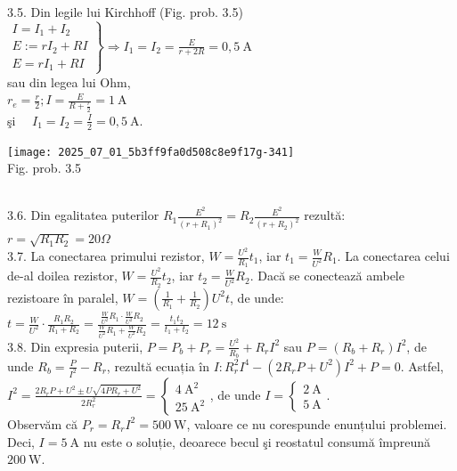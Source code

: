 3.5. Din legile lui Kirchhoff (Fig. prob. 3.5)\\ $\left.\begin{array}{l} I=I_{1}+I_{2} \\ E:=r I_{2}+R I \\ E=r I_{1}+R I \end{array}\right\} \Rightarrow I_{1}=I_{2}=\frac{E}{r+2 R}=0,5 \mathrm{~A}$\\ sau din legea lui Ohm,\\ $r_{e}=\frac{r}{2} ; I=\frac{E}{R+\frac{r}{2}}=1 \mathrm{~A}$\\ şi $\quad I_{1}=I_{2}=\frac{I}{2}=0,5 \mathrm{~A}$.\\ \begin{center} \texttt{[image: 2025\_07\_01\_5b3ff9fa0d508c8e9f17g-341]}\\ Fig. prob. 3.5 \end{center}\\

3.6. Din egalitatea puterilor $R_{1} \frac{E^{2}}{\left(r+R_{1}\right)^{2}}=R_{2} \frac{E^{2}}{\left(r+R_{2}\right)^{2}}$ rezultă:\\ $r=\sqrt{R_{1} R_{2}}=20 \Omega$\\

3.7. La conectarea primului rezistor, $W=\frac{U^{2}}{R_{1}} t_{1}$, iar $t_{1}=\frac{W}{U^{2}} R_{1}$. La conectarea celui de-al doilea rezistor, $W=\frac{U^{2}}{R_{2}} t_{2}$, iar $t_{2}=\frac{W}{U^{2}} R_{2}$. Dacă se conectează ambele rezistoare în paralel, $W=\left(\frac{1}{R_{1}}+\frac{1}{R_{2}}\right) U^{2} t$, de unde:\\ $t=\frac{W}{U^{2}} \cdot \frac{R_{1} R_{2}}{R_{1}+R_{2}}=\frac{\frac{W}{U^{2}} R_{1} \cdot \frac{W}{U^{2}} R_{2}}{\frac{W}{U^{2}} R_{1}+\frac{W}{U^{2}} R_{2}}=\frac{t_{1} t_{2}}{t_{1}+t_{2}}=12 \mathrm{~s}$\\

3.8. Din expresia puterii, $P=P_{b}+P_{r}=\frac{U^{2}}{R_{b}}+R_{r} I^{2}$ sau $P=\left(R_{b}+R_{r}\right) I^{2}$, de unde $R_{b}=\frac{P}{I^{2}}-R_{r}$, rezultă ecuația în $I: R_{r}^{2} I^{4}-\left(2 R_{r} P+U^{2}\right) I^{2}+P=0$. Astfel, $I^{2}=\frac{2 R_{r} P+U^{2} \pm U \sqrt{4 P R_{r}+U^{2}}}{2 R_{r}^{2}}=\left\{\begin{array}{l}4 \mathrm{~A}^{2} \\ 25 \mathrm{~A}^{2}\end{array}\right.$, de unde $I=\left\{\begin{array}{l}2 \mathrm{~A} \\ 5 \mathrm{~A}\end{array}\right.$.\\ Observăm că $P_{r}=R_{r} I^{2}=500 \mathrm{~W}$, valoare ce nu corespunde enunțului problemei. Deci, $I=5 \mathrm{~A}$ nu este o soluție, deoarece becul şi reostatul consumă împreună $200 \mathrm{~W}$.\\

